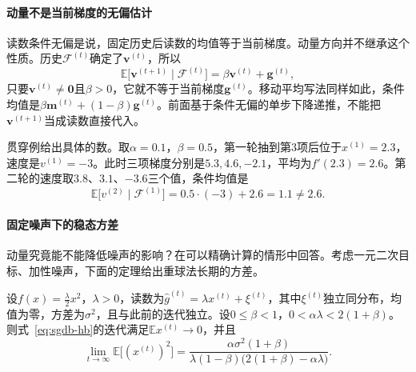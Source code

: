 \paragraph{动量不是当前梯度的无偏估计}
读数条件无偏是说，固定历史后读数的均值等于当前梯度。动量方向并不继承这个性质。历史$\mathcal{F}^{(t)}$确定了$\bm{v}^{(t)}$，所以
\begin{equation}
 \mathbb{E}\bigl[\bm{v}^{(t+1)}\mid\mathcal{F}^{(t)}\bigr]=\beta\bm{v}^{(t)}+\bm{g}^{(t)},
 \label{eq:sgdb-hb-cond}
\end{equation}
只要$\bm{v}^{(t)}\neq\bm{0}$且$\beta>0$，它就不等于当前梯度$\bm{g}^{(t)}$。移动平均写法同样如此，条件均值是$\beta\bm{m}^{(t)}+(1-\beta)\bm{g}^{(t)}$。前面基于条件无偏的单步下降递推，不能把$\bm{v}^{(t+1)}$当成读数直接代入。

贯穿例给出具体的数。取$\alpha=0.1$，$\beta=0.5$，第一轮抽到第$3$项后位于$x^{(1)}=2.3$，速度是$v^{(1)}=-3$。此时三项梯度分别是$5.3,4.6,-2.1$，平均为$f'(2.3)=2.6$。第二轮的速度取$3.8$、$3.1$、$-3.6$三个值，条件均值是
\[
 \mathbb{E}\bigl[v^{(2)}\mid\mathcal{F}^{(1)}\bigr]=0.5\cdot(-3)+2.6=1.1\neq2.6.
\]

\paragraph{固定噪声下的稳态方差}
动量究竟能不能降低噪声的影响？在可以精确计算的情形中回答。考虑一元二次目标、加性噪声，下面的定理给出重球法长期的方差。

\begin{theorem}[加性噪声下重球法的稳态方差]
\label{thm:sgdb-hb-variance}
设$f(x)=\frac\lambda2x^2$，$\lambda>0$，读数为$\hat g^{(t)}=\lambda x^{(t)}+\xi^{(t)}$，其中$\xi^{(t)}$独立同分布，均值为零，方差为$\sigma^2$，且与此前的迭代独立。设$0\leq\beta<1$，$0<\alpha\lambda<2(1+\beta)$。则式~\eqref{eq:sgdb-hb}的迭代满足$\mathbb{E}x^{(t)}\to0$，并且
\begin{equation}
 \lim_{t\to\infty}\mathbb{E}\bigl[(x^{(t)})^2\bigr]
 =\frac{\alpha\sigma^2(1+\beta)}{\lambda(1-\beta)\bigl(2(1+\beta)-\alpha\lambda\bigr)}.
 \label{eq:sgdb-hb-variance}
\end{equation}
\end{theorem}

